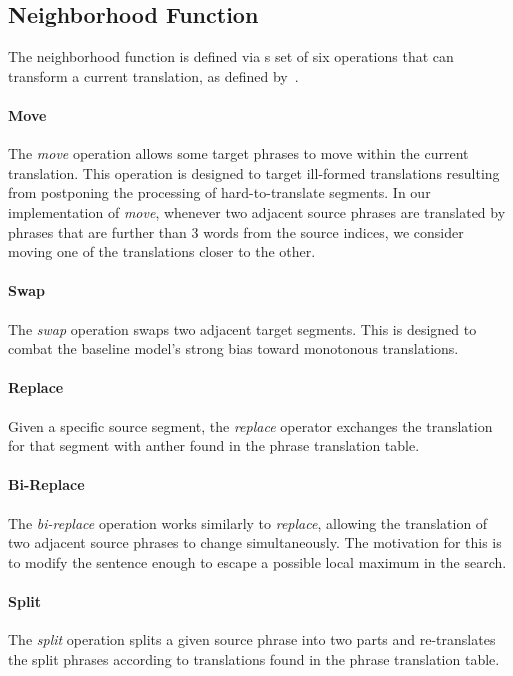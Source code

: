 \documentclass[11pt,letterpaper]{article}
\begin{document}
\subsection{Neighborhood Function}
The neighborhood function is defined via s set of six operations that can transform a current translation,
as defined by~\cite{langlais2007greedy}.

\paragraph{Move} The \textit{move} operation allows some target phrases to move within the current translation.
This operation is designed to target ill-formed translations resulting from postponing the processing of
hard-to-translate segments. In our implementation of \textit{move}, whenever two adjacent source phrases
are translated by phrases that are further than 3 words from the source indices, we consider
moving one of the translations closer to the other.

\paragraph{Swap} The \textit{swap} operation swaps two adjacent target segments. This is designed to combat
the baseline model's strong bias toward monotonous translations.

\paragraph{Replace} Given a specific source segment, the \textit{replace} operator exchanges the translation
for that segment with anther found in the phrase translation table.

\paragraph{Bi-Replace} The \textit{bi-replace} operation works similarly to \textit{replace}, allowing the
translation of two adjacent source phrases to change simultaneously. The motivation for this is to modify 
the sentence enough to escape a possible local maximum in the search.

\paragraph{Split} The \textit{split} operation splits a given source phrase into two parts and re-translates
the split phrases according to translations found in the phrase translation table.
\end{document}
